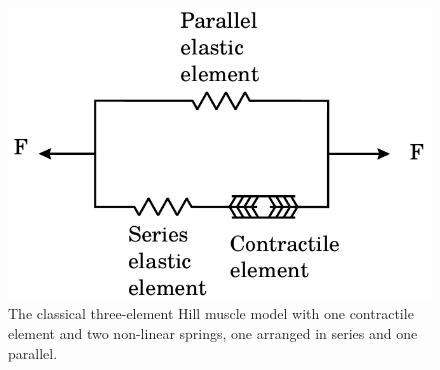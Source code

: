 

\begin{figure}[htbp]
  \centering
    \includegraphics{chapters/introduction/figures/Hill_muscle_model}
\caption{The classical three-element Hill muscle model with one
  contractile element and two non-linear springs, one arranged in
  series and one parallel. }
\label{fig:hill_muscle_model}
\end{figure}



